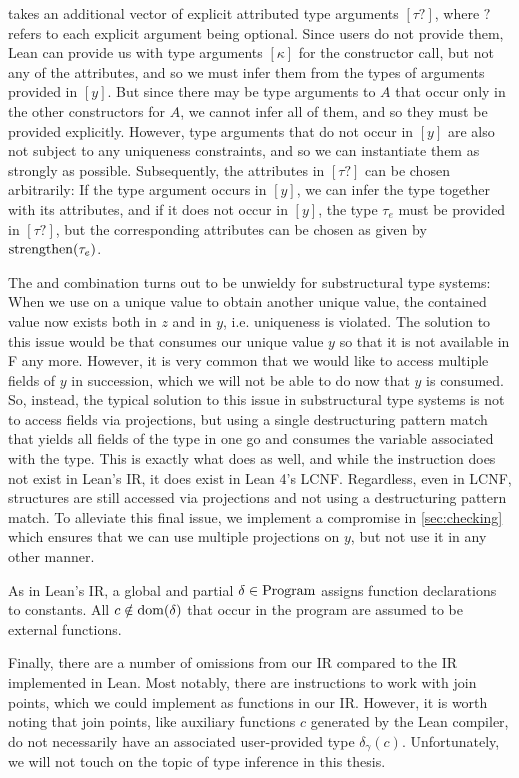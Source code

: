  takes an additional vector of explicit attributed type arguments $[\tau?]$, where $?$ refers to each explicit argument being optional. Since users do not provide them, Lean can provide us with type arguments $[\kappa]$ for the constructor call, but not any of the attributes, and so we must infer them from the types of arguments provided in $[y]$. But since there may be type arguments to $A$ that occur only in the other constructors for $A$, we cannot infer all of them, and so they must be provided explicitly. However, type arguments that do not occur in $[y]$ are also not subject to any uniqueness constraints, and so we can instantiate them as strongly as possible. Subsequently, the attributes in $[\tau?]$ can be chosen arbitrarily: If the type argument occurs in $[y]$, we can infer the type together with its attributes, and if it does not occur in $[y]$, the type $\tau_e$ must be provided in $[\tau?]$, but the corresponding attributes can be chosen as given by $\mathrm{strengthen}(\tau_e)$.

The  and  combination turns out to be unwieldy for substructural type systems: When we use  on a unique value to obtain another unique value, the contained value now exists both in $z$ and in $y$, i.e. uniqueness is violated. The solution to this issue would be that  consumes our unique value $y$ so that it is not available in F any more. However, it is very common that we would like to access multiple fields of $y$ in succession, which we will not be able to do now that $y$ is consumed. So, instead, the typical solution to this issue in substructural type systems is not to access fields via projections, but using a single destructuring pattern match that yields all fields of the type in one go and consumes the variable associated with the type. This is exactly what  does as well, and while the instruction does not exist in Lean's IR, it does exist in Lean 4's LCNF. Regardless, even in LCNF, structures are still accessed via projections and not using a destructuring pattern match. To alleviate this final issue, we implement a compromise in \cref{sec:checking} which ensures that we can use multiple projections on $y$, but not use it in any other manner.

As in Lean's IR, a global and partial $\delta \in \mathrm{Program}$ assigns function declarations to constants. All $c \notin \mathrm{dom}(\delta)$ that occur in the program are assumed to be external functions.

Finally, there are a number of omissions from our IR compared to the IR implemented in Lean. Most notably, there are instructions to work with join points, which we could implement as functions in our IR. However, it is worth noting that join points, like auxiliary functions $c$ generated by the Lean compiler, do not necessarily have an associated user-provided type $\delta_\gamma(c)$. Unfortunately, we will not touch on the topic of type inference in this thesis.

